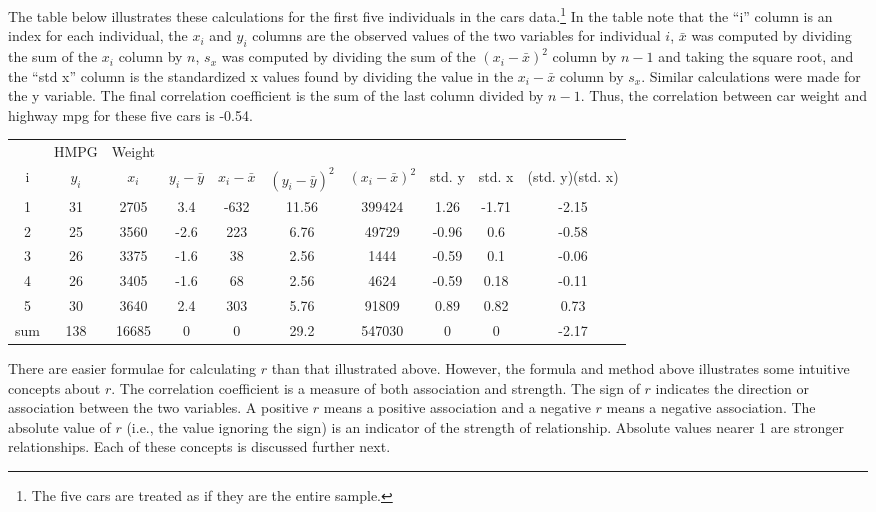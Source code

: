 \documentclass[10pt,openany]{book}\usepackage[]{graphicx}\usepackage[]{color}
\begin{document}

The table below illustrates these calculations for the first five individuals in the cars data.\footnote{The five cars are treated as if they are the entire sample.}  In the table note that the ``i'' column is an index for each individual, the $x_{i}$ and $y_{i}$ columns are the observed values of the two variables for individual $i$, $\bar{x}$ was computed by dividing the sum of the $x_{i}$ column by $n$, $s_{x}$ was computed by dividing the sum of the $(x_{i}-\bar{x})^{2}$ column by $n-1$ and taking the square root, and the ``std x'' column is the standardized x values found by dividing the value in the $x_{i}-\bar{x}$ column by $s_{x}$.  Similar calculations were made for the y variable.  The final correlation coefficient is the sum of the last column divided by $n-1$.  Thus, the correlation between car weight and highway mpg for these five cars is -0.54.

\begin{center}
  \begin{tabular}{cccccccccc}
\hline\hline
 & HMPG & Weight & & & & & & & \\
i & $y_{i}$ & $x_{i}$ & $y_{i}-\bar{y}$ & $x_{i}-\bar{x}$ & $(y_{i}-\bar{y})^{2}$ & $(x_{i}-\bar{x})^{2}$ & std. y & std. x & (std. y)(std. x) \\
\hline
1 & 31 & 2705 &  3.4 & -632 & 11.56 & 399424 &  1.26 & -1.71 & -2.15 \\
2 & 25 & 3560 & -2.6 &  223 &  6.76 &  49729 & -0.96 &  0.6  & -0.58 \\
3 & 26 & 3375 & -1.6 &   38 &  2.56 &   1444 & -0.59 &  0.1  & -0.06 \\
4 & 26 & 3405 & -1.6 &   68 &  2.56 &   4624 & -0.59 &  0.18 & -0.11 \\
5 & 30 & 3640 &  2.4 &  303 &  5.76 &  91809 &  0.89 &  0.82 &  0.73 \\
\hline
sum & 138 & 16685 & 0 & 0 & 29.2 & 547030 & 0 & 0 &  -2.17 \\
\hline\hline
  \end{tabular}
\end{center}

There are easier formulae for calculating $r$ than that illustrated above.  However, the formula and method above illustrates some intuitive concepts about $r$. The correlation coefficient is a measure of both association and strength.  The sign of $r$ indicates the direction or association between the two variables.  A positive $r$ means a positive association and a negative $r$ means a negative association.  The absolute value of $r$ (i.e., the value ignoring the sign) is an indicator of the strength of relationship.  Absolute values nearer 1 are stronger relationships.  Each of these concepts is discussed further next.
\end{document}
